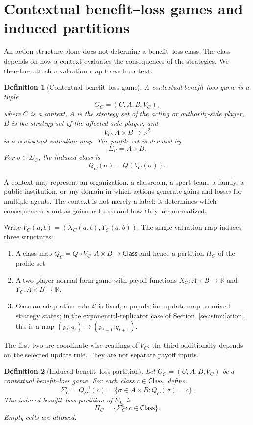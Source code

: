 \documentclass[a4paper,fleqn]{cas-dc}
\newtheorem{definition}{Definition}[section]
\theoremstyle{remark}
\newcommand{\R}{\mathbb{R}}
\newcommand{\Class}{\mathsf{Class}}
\newcommand{\Prof}{\Sigma}
\begin{document}
\section{Contextual benefit--loss games and induced partitions}
\label{sec:contextual-games}

An action structure alone does not determine a benefit--loss class. The class depends on how a context evaluates the consequences of the strategies. We therefore attach a valuation map to each context.

\begin{definition}[Contextual benefit--loss game]
A contextual benefit--loss game is a tuple
\[
G_C=(C,A,B,V_C),
\]
where $C$ is a context, $A$ is the strategy set of the acting or authority-side player, $B$ is the strategy set of the affected-side player, and
\[
V_C:A\times B\longrightarrow \R^2
\]
is a contextual valuation map. The profile set is denoted by
\[
\Prof_C=A\times B.
\]
For $\sigma\in\Prof_C$, the induced class is
\[
Q_C(\sigma)=Q(V_C(\sigma)).
\]
\end{definition}

A context may represent an organization, a classroom, a sport team, a family, a public institution, or any domain in which actions generate gains and losses for multiple agents. The context is not merely a label: it determines which consequences count as gains or losses and how they are normalized.

Write $V_C(a,b)=(X_C(a,b),Y_C(a,b))$.  The single valuation map
induces three structures:
\begin{enumerate}[label=(\roman*)]
\item A class map $Q_C=Q\circ V_C:A\times B\to \Class$ and hence a partition $\Pi_C$ of the profile set.
\item A two-player normal-form game with payoff functions $X_C:A\times B\to\R$ and $Y_C:A\times B\to\R$.
\item Once an adaptation rule $\mathcal L$ is fixed, a population update map on mixed strategy states; in the exponential-replicator case of Section~\ref{sec:simulation}, this is a map $(p_t,q_t)\mapsto(p_{t+1},q_{t+1})$.
\end{enumerate}
The first two are coordinate-wise readings of $V_C$; the third additionally
depends on the selected update rule.  They are not separate payoff inputs.

\begin{definition}[Induced benefit--loss partition]
Let $G_C=(C,A,B,V_C)$ be a contextual benefit--loss game. For each class $c\in\Class$, define
\[
\Prof_C^c=Q_C^{-1}(c)=\{\sigma\in A\times B:Q_C(\sigma)=c\}.
\]
The induced benefit--loss partition of $\Prof_C$ is
\[
\Pi_C=\{\Prof_C^c:c\in\Class\}.
\]
Empty cells are allowed.
\end{definition}
\end{document}
